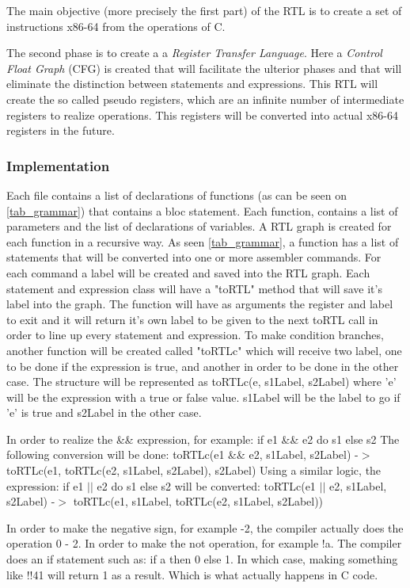 \documentclass[conference]{IEEEtran}
\begin{document}
The main objective (more precisely the first part) of the RTL is to create a set of instructions x86-64 from the operations of C.

The second phase is to create a a \textit{Register Transfer Language}. Here a \textit{Control Float Graph} (CFG) is created that will facilitate the ulterior phases and that will eliminate the distinction between statements and expressions. This RTL will create the so called pseudo registers, which are an infinite number of intermediate registers to realize operations. This registers will be converted into actual x86-64 registers in the future.

\subsubsection{Implementation}
Each file contains a list of declarations of functions (as can be seen on \ref{tab_grammar}) that contains a bloc statement. Each function, contains a list of parameters and the list of declarations of variables.
A RTL graph is created for each function in a recursive way. As seen \ref{tab_grammar}, a function has a list of statements that will be converted into one or more assembler commands. For each command a label will be created and saved into the RTL graph. Each statement and expression class will have a "toRTL" method that will save it's label into the graph. The function will have as arguments the register and label to exit and it will return it's own label to be given to the next toRTL call in order to line up every statement and expression. 
To make condition branches, another function will be created called "toRTLc" which will receive two label, one to be done if the expression is true, and another in order to be done in the other case. The structure will be represented as toRTLc(e, s1Label, s2Label) where 'e' will be the expression with a true or false value. s1Label will be the label to go if 'e' is true and s2Label in the other case.

In order to realize the \&\& expression, for example:
if e1 \&\& e2 do s1 else s2
The following conversion will be done:
toRTLc(e1 \&\& e2, s1Label, s2Label) -$>$ toRTLc(e1, toRTLc(e2, s1Label, s2Label), s2Label)
Using a similar logic, the expression:
if e1 $|$$|$ e2 do s1 else s2
will be converted:
toRTLc(e1 $|$$|$ e2, s1Label, s2Label) -$>$ toRTLc(e1, s1Label, toRTLc(e2, s1Label, s2Label))

In order to make the negative sign, for example -2, the compiler actually does the operation 0 - 2.
In order to make the not operation, for example !a. The compiler does an if statement such as:
if a then 0 else 1. %
In which case, making something like !!41 will return 1 as a result. Which is what actually happens in C code.
\end{document}
